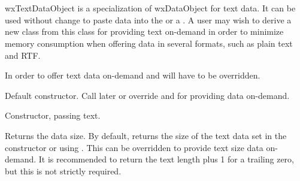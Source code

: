 \section{}\label{wxtextdataobject}

wxTextDataObject is a specialization of wxDataObject for text data. It can be
used without change to paste data into the 
or a . A user may wish to derive a new class
from this class for providing text on-demand in order to minimize memory consumption
when offering data in several formats, such as plain text and RTF.

In order to offer text data on-demand  
and  will have to be overridden.






\label{wxtextdataobjectwxtextdataobject}


Default constructor. Call  later
or override  and 
 for providing data on-demand.


Constructor, passing text.

\label{wxtextdataobjectgetsize}


Returns the data size. By default, returns the size of the text data
set in the constructor or using .
This can be overridden to provide text size data on-demand. It is recommended
to return the text length plus 1 for a trailing zero, but this is not
strictly required.

\label{wxtextdataobjectgettext}


